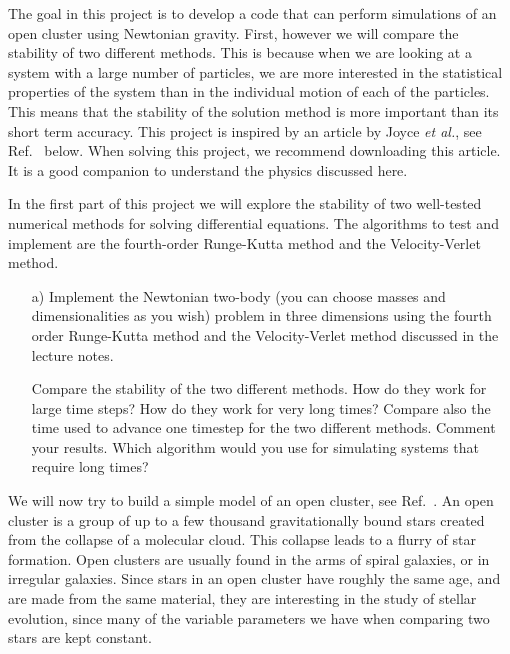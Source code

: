 \documentclass[11pt,a4wide]{article}
\begin{document}
The goal in this project is to develop a code that can perform simulations of an
open cluster using Newtonian gravity. First, however we will compare
the stability of two different methods. This is because when we are
looking at a system with a large number of particles, we are more
interested in the statistical properties of the system than in the
individual motion of each of the particles. This means that the
stability of the solution method is more important than its short term
accuracy.  This project is inspired by an article by Joyce {\em et al.}, see Ref.~\cite{joyce2010} below.
When  solving this project, we recommend downloading this article. It is a good companion to understand the 
physics discussed here. 

In the first part of this project we will explore the stability of two
well-tested numerical methods for solving differential equations. The algorithms to test and implement are the fourth-order Runge-Kutta method and the Velocity-Verlet method. 

\begin{enumerate}
\item[a)] Implement the Newtonian two-body (you can choose masses and dimensionalities as
  you wish) problem in three dimensions using the fourth order
  Runge-Kutta method and the Velocity-Verlet method discussed in
  the lecture notes.

 Compare the
stability of the two different methods. How do they work for large
time steps? How do they work for very long times? Compare also the
time used to advance one timestep for the two different
methods. Comment your results. Which algorithm would you use for
simulating systems that require long  times?

\end{enumerate}





We will now try to build a simple model of an open
cluster, see Ref.~\cite{openclusterref}. An
open cluster is a group of up to a few thousand gravitationally bound
stars created from the collapse of a molecular cloud. This collapse
leads to a flurry of star formation. Open clusters are usually found
in the arms of spiral galaxies, or in irregular galaxies. Since stars
in an open cluster have roughly the same age, and are made from the
same material, they are interesting in the study of stellar evolution,
since many of the variable parameters we have when comparing two stars
are kept constant.
\end{document}
